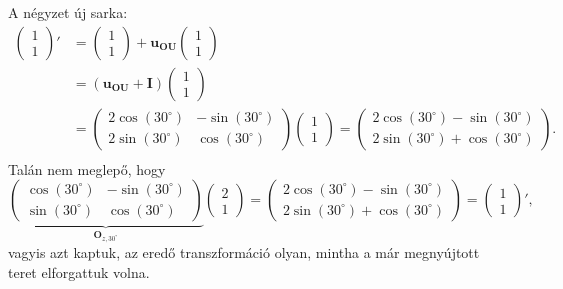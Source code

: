 \documentclass[12pt,a4paper]{scrartcl}
\let\mathbf\bm
\begin{document}
A négyzet új sarka:
\[\begin{aligned}
  \left( {\begin{array}{*{20}{c}}
  1 \\ 
  1 
\end{array}} \right)' &  = \left( {\begin{array}{*{20}{c}}
  1 \\ 
  1 
\end{array}} \right) + {{\mathbf{u}}_{{\mathbf{OU}}}}\left( {\begin{array}{*{20}{c}}
  1 \\ 
  1 
\end{array}} \right) \\ 
   &  = \left( {{{\mathbf{u}}_{{\mathbf{OU}}}} + {\mathbf{I}}} \right)\left( {\begin{array}{*{20}{c}}
  1 \\ 
  1 
\end{array}} \right) \\ 
   &  = \left( {\begin{array}{*{20}{c}}
  {2\cos \left( {30^\circ } \right)}&{ - \sin \left( {30^\circ } \right)} \\ 
  {2\sin \left( {30^\circ } \right)}&{\cos \left( {30^\circ } \right)} 
\end{array}} \right)\left( {\begin{array}{*{20}{c}}
  1 \\ 
  1 
\end{array}} \right) = \left( {\begin{array}{*{20}{c}}
  {2\cos \left( {30^\circ } \right) - \sin \left( {30^\circ } \right)} \\ 
  {2\sin \left( {30^\circ } \right) + \cos \left( {30^\circ } \right)} 
\end{array}} \right). \\ 
\end{aligned} \]
Talán nem meglepő, hogy
\[\underbrace {\left( {\begin{array}{*{20}{c}}
  {\cos \left( {30^\circ } \right)}&{ - \sin \left( {30^\circ } \right)} \\ 
  {\sin \left( {30^\circ } \right)}&{\cos \left( {30^\circ } \right)} 
\end{array}} \right)}_{{{\mathbf{O}}_{z,30^\circ }}}\left( {\begin{array}{*{20}{c}}
  2 \\ 
  1 
\end{array}} \right) = \left( {\begin{array}{*{20}{c}}
  {2\cos \left( {30^\circ } \right) - \sin \left( {30^\circ } \right)} \\ 
  {2\sin \left( {30^\circ } \right) + \cos \left( {30^\circ } \right)} 
\end{array}} \right) = \left( {\begin{array}{*{20}{c}}
  1 \\ 
  1 
\end{array}} \right)',\]
vagyis azt kaptuk, az eredő transzformáció olyan, mintha a már megnyújtott teret elforgattuk volna.
\end{document}

